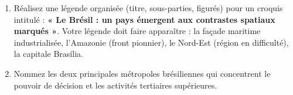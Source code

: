 \documentclass[11pt]{article}
\begin{document}
\begin{exercice}
\begin{enumerate}
    \item Réalisez une légende organisée (titre, sous-parties, figurés) pour un croquis intitulé : \textbf{« Le Brésil : un pays émergent aux contrastes spatiaux marqués »}. Votre légende doit faire apparaître : la façade maritime industrialisée, l'Amazonie (front pionnier), le Nord-Est (région en difficulté), la capitale Brasília.
    \item Nommez les deux principales métropoles brésiliennes qui concentrent le pouvoir de décision et les activités tertiaires supérieures. \underline{\hspace{5cm}}
\end{enumerate}
\end{exercice}
\end{document}
